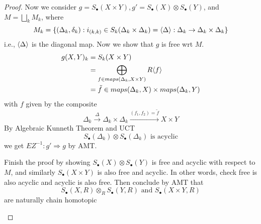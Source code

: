 \begin{proof}
    Now we consider $g=S_\bullet(X\times Y), g'=S_\bullet(X)\otimes S_\bullet(Y)$, and $M=\bigsqcup_kM_k$, where 
    \begin{equation*}
        M_k=\{(\Delta_k,\delta_k):i_{(k,k)}\in S_k(\Delta_k\times\Delta_k)=\langle\Delta\rangle:\Delta_k\to\Delta_k\times\Delta_k\}
    \end{equation*}
    i.e., $\langle\Delta\rangle$ is the diagonal map. Now we show that $g$ is free wrt $M$. 
    \begin{align*}
        g(X,Y)_k&=S_k(X\times Y)\\
        &=\bigoplus_{f\in maps(\Delta_k,X\times Y)}R\langle f\rangle\\
        &=\tilde{f}\in maps(\Delta_k,X)\times maps(\Delta_k,Y)
    \end{align*}
    with $f$ given by the composite 
    \begin{equation*}
        \Delta_k\xrightarrow{\Delta}\Delta_k\times\Delta_k\xrightarrow{(f_1,f_2)=\tilde{f}}X\times Y
    \end{equation*}
    By Algebraic Kunneth Theorem and UCT
    \begin{equation*}
        S_\bullet(\Delta_k)\otimes S_\bullet(\Delta_k) \text{ is acyclic}
    \end{equation*}
    we get $EZ^{-1}:g'\Rightarrow g$ by AMT.

    \begin{prob}[HW(3.2)]
        Finish the proof by showing $S_\bullet(X)\otimes S_\bullet(Y)$ is free and acyclic with respect to $M$, and similarly $S_\bullet(X\times Y)$ is also free and acyclic. In other words, check free is also acyclic and acyclic is also free. Then conclude by AMT that 
        \begin{equation*}
            S_\bullet(X,R)\otimes_R S_\bullet(Y,R) \text{ and } S_\bullet(X\times Y,R)
        \end{equation*}
        are naturally chain homotopic
    \end{prob}
\end{proof}








